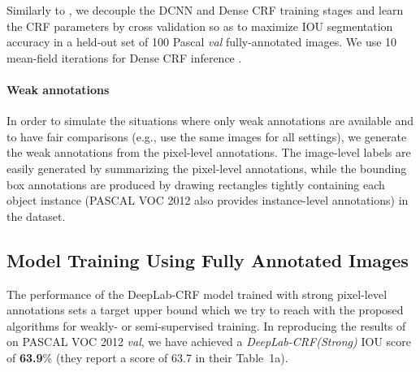 Similarly to \citet{chen2014semantic}, we decouple the DCNN and Dense
CRF training stages and learn the CRF parameters by cross validation
so as to maximize IOU segmentation accuracy in a held-out set of 100
Pascal \textsl{val} fully-annotated images. We use 10 mean-field
iterations for Dense CRF inference \citep{krahenbuhl2011efficient}.

\paragraph{Weak annotations}

In order to simulate the situations where only weak annotations are
available and to have fair comparisons (e.g., use the same images for
all settings), we generate the weak annotations from the pixel-level
annotations. The image-level labels are easily generated by
summarizing the pixel-level annotations, while the bounding box
annotations are produced by drawing rectangles tightly containing each
object instance (PASCAL VOC 2012 also provides instance-level
annotations) in the dataset.

\subsection{Model Training Using Fully Annotated Images}
\label{sec:test_pixel}

The performance of the DeepLab-CRF model trained with strong
pixel-level annotations sets a target upper bound which we try to
reach with the proposed algorithms for weakly- or semi-supervised
training. In reproducing the results of \citep{chen2014semantic} on
PASCAL VOC 2012 \textsl{val}, we have achieved a
\textsl{DeepLab-CRF(Strong)} IOU score of \textbf{63.9}\% (they
report a score of 63.7 in their Table~1a).


